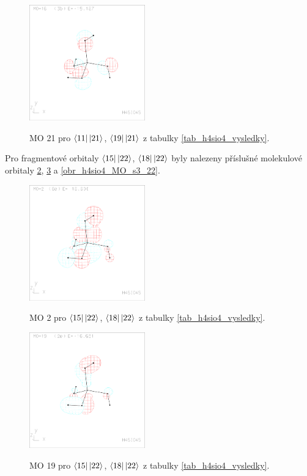 \documentclass[
  digital, %
  table,   %
  lof,     %
  lot,     %
]{fithesis3}
\begin{document}
\begin{figure}[h]
\caption{MO 21 pro $\bra{11}\ket{21}$, $\bra{19}\ket{21}$ z tabulky \ref{tab_h4sio4_vysledky}.  }
  \center
  \includegraphics[width=5cm]{h4sio4_obrazky/s2_16.eps}
  \label{obr_h4sio4_MO_s2_21}
  \end{figure}
  
  Pro fragmentové orbitaly $\bra{15}\ket{22}$, $\bra{18}\ket{22}$ byly nalezeny příslušné molekulové orbitaly \ref{obr_h4sio4_MO_s3_2}, \ref{obr_h4sio4_MO_s3_19} a \ref{obr_h4sio4_MO_s3_22}.
  
  \begin{figure}[h]
\caption{MO 2 pro $\bra{15}\ket{22}$, $\bra{18}\ket{22}$ z tabulky \ref{tab_h4sio4_vysledky}.  }
  \center
  \includegraphics[width=5cm]{h4sio4_obrazky/s3__2.eps}
  \label{obr_h4sio4_MO_s3_2}
  \end{figure}

\begin{figure}[h]
\caption{MO 19 pro $\bra{15}\ket{22}$, $\bra{18}\ket{22}$ z tabulky \ref{tab_h4sio4_vysledky}.  }
  \center
  \includegraphics[width=5cm]{h4sio4_obrazky/s3__19.eps}
  \label{obr_h4sio4_MO_s3_19}
  \end{figure}
\end{document}
